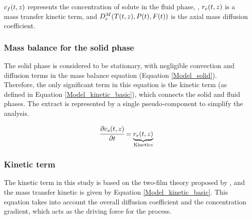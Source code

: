 \documentclass[../Article_Sensitivity_Analsysis.tex]{subfiles}
\begin{document}
	${\color{black}c_f}(t,z)$ represents the concentration of solute in the fluid phase, , ${\color{black}r_e}(t,z)$ is a mass transfer kinetic term, and ${\color{black}D^M_e}({\color{black}T}(t,z),{\color{black}P}(t),{\color{black}F}(t))$ is the axial mass diffusion coefficient.
	
	\subsubsection{Mass balance for the solid phase} \label{Mass_balance_solid}
	
	The solid phase is considered to be stationary, with negligible convection and diffusion terms in the mass balance equation (Equation \ref{Model_solid}). Therefore, the only significant term in this equation is the kinetic term (as defined in Equation \ref{Model_kinetic_basic}), which connects the solid and fluid phases. The extract is represented by a single pseudo-component to simplify the analysis. 
	
	{\footnotesize
		\begin{equation} 
			\label{Model_solid}
					\cfrac{\partial {\color{black}c_s}(t,z)}{\partial t} = \underbrace{ {\color{black}r_e}(t,z) }_{\text{Kinetics}}
			\end{equation} }
			
	\subsubsection{Kinetic term} \label{CH: Kinetic}
	
	
	The kinetic term in this study is based on the two-film theory proposed by \citet{Reverchon1996}, and the mass transfer kinetic is given by Equation \ref{Model_kinetic_basic}. This equation takes into account the overall diffusion coefficient and the concentration gradient, which acts as the driving force for the process.
	
\end{document}
